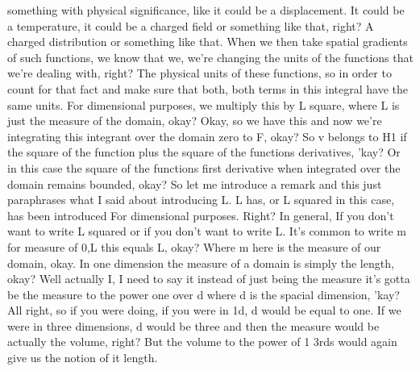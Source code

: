\documentclass[10pt]{article}
\begin{document}
something with physical significance, like it could be a displacement. It could be a temperature, it could be a charged field or something like that, right? A charged distribution or something like that. When we then take spatial gradients of such functions, we know that we, we're changing the units of the functions that we're dealing with, right? The physical units of these functions, so in order to count for that fact and make sure that both, both terms in this integral have the same units. For dimensional purposes, we multiply this by L square, where L is just the measure of the domain, okay? Okay, so we have this and now we're integrating this integrant over the domain zero to F, okay? So v belongs to H1 if the square of the function plus the square of the functions derivatives, 'kay? Or in this case the square of the functions first derivative when integrated over the domain remains bounded, okay? So let me introduce a remark and this just paraphrases what I said about introducing L. L has, or L squared in this case, has been introduced For dimensional purposes. Right? In general, If you don't want to write L squared or if you don't want to write L. It's common to write m for measure of 0,L this equals L, okay? Where m here is the measure of our domain, okay. In one dimension the measure of a domain is simply the length, okay? Well actually I, I need to say it instead of just being the measure it's gotta be the measure to the power one over d where d is the spacial dimension, 'kay? All right, so if you were doing, if you were in 1d, d would be equal to one. If we were in three dimensions, d would be three and then the measure would be actually the volume, right? But the volume to the power of 1 3rds would again give us the notion of it length.
\end{document}
